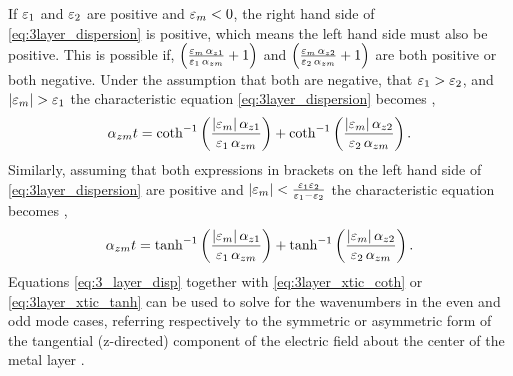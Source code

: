 \documentclass[11pt]{article}
\begin{document}
If $\varepsilon_1$ and $\varepsilon_2$ are positive and $\varepsilon_m < 0$, the right hand side of \eqref{eq:3layer_dispersion} is positive, which means the left hand side must also be positive. This is possible if,
$\left( \frac{\varepsilon_m \,\alpha_{z1}}{\varepsilon_1 \,\alpha_{zm}} + 1 \right)$ and
$\left( \frac{\varepsilon_m \,\alpha_{z2}}{\varepsilon_2 \,\alpha_{zm}} + 1 \right)$ are both positive or both negative. Under the assumption that both are negative, that
$ \varepsilon_1 > \varepsilon_2 $, and $\left| \varepsilon_m \right| > \varepsilon_1$  the characteristic equation \eqref{eq:3layer_dispersion} becomes \cite{Durach_2007},
%
\begin{equation}
  \alpha_{zm}t = \coth ^{-1} \left( \frac{\left| \varepsilon_m \right|\alpha_{z1}}{\varepsilon_1 \,\alpha_{zm}} \right) + \coth ^{-1} \left( \frac{\left| \varepsilon_m \right|\alpha_{z2}}{\varepsilon_2 \,\alpha_{zm}} \right).
  \label{eq:3layer_xtic_coth}
\end{equation}
%
Similarly, assuming that both expressions in brackets on the left hand side of \eqref{eq:3layer_dispersion} are positive and
$\left| \varepsilon_m  \right| < \frac{\varepsilon_1 \varepsilon_2}{\varepsilon_1 - \varepsilon_2}$  the characteristic equation becomes \cite{Durach_2007},
%
\begin{equation}
  \alpha_{zm} t = \tanh^{-1} \left( \frac{\left| \varepsilon_m \right| \alpha_{z1}}{\varepsilon_1 \,\alpha_{zm}} \right) + \tanh^{-1} \left( \frac{\left| \varepsilon_m \right| \alpha_{z2}}{\varepsilon_2 \,\alpha_{zm}} \right).
  \label{eq:3layer_xtic_tanh}
\end{equation}
%
Equations \eqref{eq:3_layer_disp} together with \eqref{eq:3layer_xtic_coth} or \eqref{eq:3layer_xtic_tanh} can be used to solve for the wavenumbers in the even and odd mode cases, referring respectively to the symmetric or asymmetric form of the tangential (z-directed) component of the electric field about the center of the metal layer \cite{Burke1986}.
\end{document}
